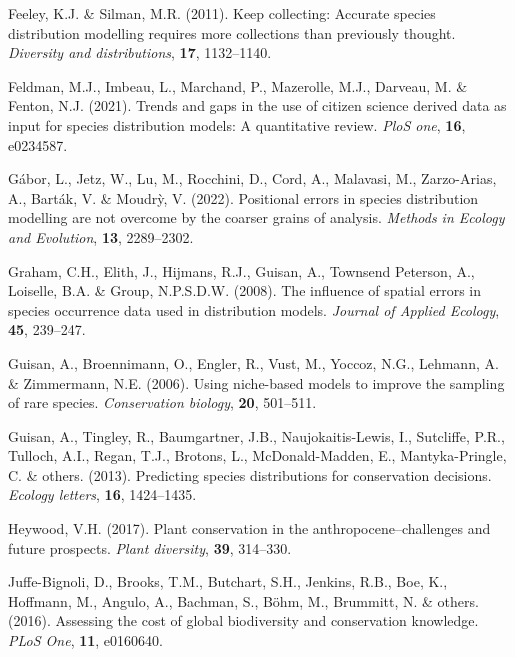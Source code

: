 \documentclass[
]{article}
\newlength{\cslhangindent}
\newlength{\cslentryspacingunit} %
\newenvironment{CSLReferences}[2] %
 {%
  \setlength{\parindent}{0pt}
  \ifodd #1
  \let\oldpar\par
  \def\par{\hangindent=\cslhangindent\oldpar}
  \fi
  \setlength{\parskip}{#2\cslentryspacingunit}
 }%
 {}
\begin{document}
\begin{CSLReferences}{1}{0}
\leavevmode{}%
Feeley, K.J. \& Silman, M.R. (2011). Keep collecting: Accurate species
distribution modelling requires more collections than previously
thought. \emph{Diversity and distributions}, \textbf{17}, 1132--1140.

\leavevmode{}%
Feldman, M.J., Imbeau, L., Marchand, P., Mazerolle, M.J., Darveau, M. \&
Fenton, N.J. (2021). Trends and gaps in the use of citizen science
derived data as input for species distribution models: A quantitative
review. \emph{PloS one}, \textbf{16}, e0234587.

\leavevmode{}%
Gábor, L., Jetz, W., Lu, M., Rocchini, D., Cord, A., Malavasi, M.,
Zarzo-Arias, A., Barták, V. \& Moudrỳ, V. (2022). Positional errors in
species distribution modelling are not overcome by the coarser grains of
analysis. \emph{Methods in Ecology and Evolution}, \textbf{13},
2289--2302.

\leavevmode{}%
Graham, C.H., Elith, J., Hijmans, R.J., Guisan, A., Townsend Peterson,
A., Loiselle, B.A. \& Group, N.P.S.D.W. (2008). The influence of spatial
errors in species occurrence data used in distribution models.
\emph{Journal of Applied Ecology}, \textbf{45}, 239--247.

\leavevmode{}%
Guisan, A., Broennimann, O., Engler, R., Vust, M., Yoccoz, N.G.,
Lehmann, A. \& Zimmermann, N.E. (2006). Using niche-based models to
improve the sampling of rare species. \emph{Conservation biology},
\textbf{20}, 501--511.

\leavevmode{}%
Guisan, A., Tingley, R., Baumgartner, J.B., Naujokaitis-Lewis, I.,
Sutcliffe, P.R., Tulloch, A.I., Regan, T.J., Brotons, L.,
McDonald-Madden, E., Mantyka-Pringle, C. \& others. (2013). Predicting
species distributions for conservation decisions. \emph{Ecology
letters}, \textbf{16}, 1424--1435.

\leavevmode{}%
Heywood, V.H. (2017). Plant conservation in the anthropocene--challenges
and future prospects. \emph{Plant diversity}, \textbf{39}, 314--330.

\leavevmode{}%
Juffe-Bignoli, D., Brooks, T.M., Butchart, S.H., Jenkins, R.B., Boe, K.,
Hoffmann, M., Angulo, A., Bachman, S., Böhm, M., Brummitt, N. \& others.
(2016). Assessing the cost of global biodiversity and conservation
knowledge. \emph{PLoS One}, \textbf{11}, e0160640.


\end{CSLReferences}
\end{document}
